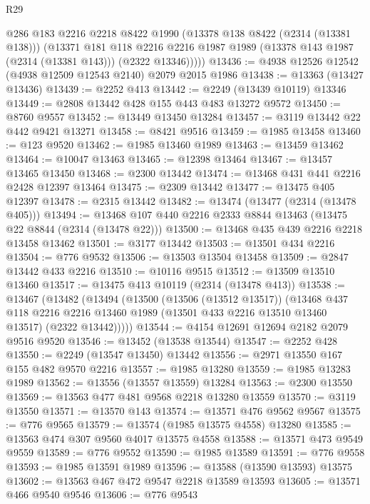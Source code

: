 \begin{lexlean}{R29}
\begin{coremodule}
          @286
          @183
          @2216
          @2218
          @8422
          @1990
          (@13378 @138 @8422 (@2314 (@13381 @138)))
          (@13371
            @181
            @118
            @2216
            @2216
            @1987
            @1989
            (@13378 @143 @1987 (@2314 (@13381 @143)))
            (@2322 @13346)))))
@13436 := @4938 @12526 @12542 (@4938 @12509 @12543 @2140) @2079 @2015 @1986
@13438 := @13363 (@13427 @13436)
@13439 := @2252 @413
@13442 := @2249 (@13439 @10119) @13346
@13449 := @2808 @13442 @428 @155 @443 @483 @13272 @9572
@13450 := @8760 @9557
@13452 := @13449 @13450 @13284
@13457 := @3119 @13442 @22 @442 @9421 @13271
@13458 := @8421 @9516
@13459 := @1985 @13458
@13460 := @123 @9520
@13462 := @1985 @13460 @1989
@13463 := @13459 @13462
@13464 := @10047 @13463
@13465 := @12398 @13464
@13467 := @13457 @13465 @13450
@13468 := @2300 @13442
@13474 := @13468 @431 @441 @2216 @2428 @12397 @13464
@13475 := @2309 @13442
@13477 := @13475 @405 @12397
@13478 := @2315 @13442
@13482 := @13474 (@13477 (@2314 (@13478 @405)))
@13494 := @13468 @107 @440 @2216 @2333 @8844 @13463 (@13475 @22 @8844 (@2314 (@13478 @22)))
@13500 := @13468 @435 @439 @2216 @2218 @13458 @13462
@13501 := @3177 @13442
@13503 := @13501 @434 @2216
@13504 := @776 @9532
@13506 := @13503 @13504 @13458
@13509 := @2847 @13442 @433 @2216
@13510 := @10116 @9515
@13512 := @13509 @13510 @13460
@13517 := @13475 @413 @10119 (@2314 (@13478 @413))
@13538 := @13467
    (@13482
      (@13494
        (@13500
          (@13506 (@13512 @13517))
          (@13468
            @437
            @118
            @2216
            @2216
            @13460
            @1989
            (@13501 @433 @2216 @13510 @13460 @13517)
            (@2322 @13442)))))
@13544 := @4154 @12691 @12694 @2182 @2079 @9516 @9520
@13546 := @13452 (@13538 @13544)
@13547 := @2252 @428
@13550 := @2249 (@13547 @13450) @13442
@13556 := @2971 @13550 @167 @155 @482 @9570 @2216
@13557 := @1985 @13280
@13559 := @1985 @13283 @1989
@13562 := @13556 (@13557 @13559) @13284
@13563 := @2300 @13550
@13569 := @13563 @477 @481 @9568 @2218 @13280 @13559
@13570 := @3119 @13550
@13571 := @13570 @143
@13574 := @13571 @476 @9562 @9567
@13575 := @776 @9565
@13579 := @13574 (@1985 @13575 @4558) @13280
@13585 := @13563 @474 @307 @9560 @4017 @13575 @4558
@13588 := @13571 @473 @9549 @9559
@13589 := @776 @9552
@13590 := @1985 @13589
@13591 := @776 @9558
@13593 := @1985 @13591 @1989
@13596 := @13588 (@13590 @13593) @13575
@13602 := @13563 @467 @472 @9547 @2218 @13589 @13593
@13605 := @13571 @466 @9540 @9546
@13606 := @776 @9543

\end{coremodule}
\end{lexlean}
